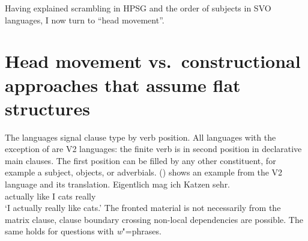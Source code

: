\documentclass[output=paper,biblatex,babelshorthands,newtxmath,draftmode,colorlinks,citecolor=brown]{langscibook}
\begin{document}
Having explained scrambling in HPSG and the order of subjects in SVO languages, I now turn to ``head movement''.



\section{Head movement vs.\ constructional approaches that assume flat structures}
\label{sec-head-movement-vs-flat}


The  languages signal clause type by verb position. All  languages with the
exception of  are V2 languages: the finite verb is in second position in declarative main
clauses. The first position can be filled by any other constituent, for example a subject,
objects, or adverbials. () shows an example from the V2 language  and its  translation.
\ea 
\gll Eigentlich mag ich Katzen sehr.\\
     actually   like I cats really\\
\glt `I actually really like cats.'
\z
The fronted material is not necessarily from the matrix clause, clause boundary
crossing non-local dependencies are possible. The same holds for questions with \emph{w}"=phrases. 
\end{document}
